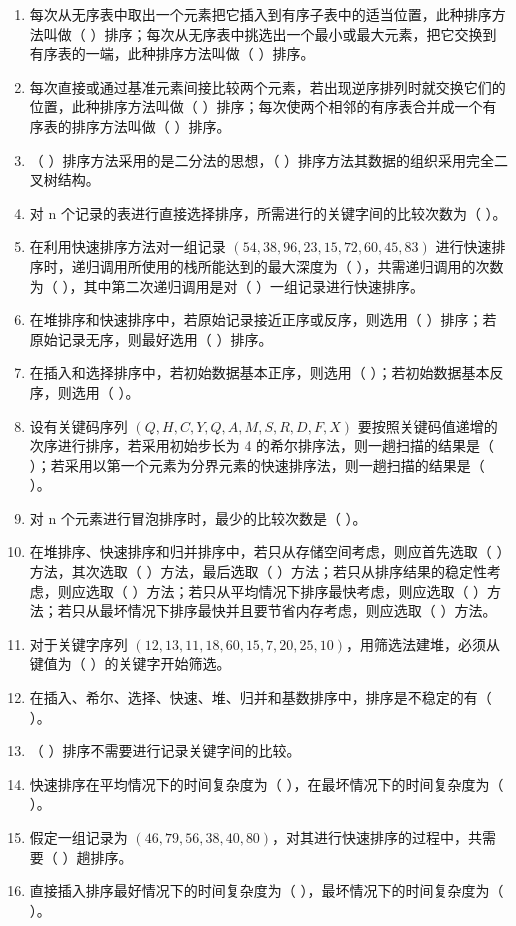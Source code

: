 \documentclass[12pt, a4paper]{article}
\begin{document}
\begin{enumerate}
	\item 每次从无序表中取出一个元素把它插入到有序子表中的适当位置，此种排序方法叫做（ ）排序；每次从无序表中挑选出一个最小或最大元素，把它交换到有序表的一端，此种排序方法叫做（ ）排序。
	\item 每次直接或通过基准元素间接比较两个元素，若出现逆序排列时就交换它们的位置，此种排序方法叫做（ ）排序；每次使两个相邻的有序表合并成一个有序表的排序方法叫做（ ）排序。
	\item （ ）排序方法采用的是二分法的思想，（ ）排序方法其数据的组织采用完全二叉树结构。
	\item 对 n 个记录的表进行直接选择排序，所需进行的关键字间的比较次数为（ ）。
	\item 在利用快速排序方法对一组记录 $(54, 38, 96, 23, 15, 72, 60, 45, 83)$ 进行快速排序时，递归调用所使用的栈所能达到的最大深度为（ ），共需递归调用的次数为（ ），其中第二次递归调用是对（ ）一组记录进行快速排序。
	\item 在堆排序和快速排序中，若原始记录接近正序或反序，则选用（ ）排序；若原始记录无序，则最好选用（ ）排序。
	\item 在插入和选择排序中，若初始数据基本正序，则选用（ ）；若初始数据基本反序，则选用（ ）。
	\item 设有关键码序列 $(Q, H, C, Y, Q, A, M, S, R, D, F, X)$ 要按照关键码值递增的次序进行排序，若采用初始步长为 4 的希尔排序法，则一趟扫描的结果是（ ）；若采用以第一个元素为分界元素的快速排序法，则一趟扫描的结果是（ ）。
	\item 对 n 个元素进行冒泡排序时，最少的比较次数是（ ）。
	\item 在堆排序、快速排序和归并排序中，若只从存储空间考虑，则应首先选取（ ）方法，其次选取（ ）方法，最后选取（ ）方法；若只从排序结果的稳定性考虑，则应选取（ ）方法；若只从平均情况下排序最快考虑，则应选取（ ）方法；若只从最坏情况下排序最快并且要节省内存考虑，则应选取（ ）方法。
	\item 对于关键字序列 $(12, 13, 11, 18, 60, 15, 7, 20, 25, 10)$，用筛选法建堆，必须从键值为（ ）的关键字开始筛选。
	\item 在插入、希尔、选择、快速、堆、归并和基数排序中，排序是不稳定的有（ ）。
	\item （ ）排序不需要进行记录关键字间的比较。
	\item 快速排序在平均情况下的时间复杂度为（ ），在最坏情况下的时间复杂度为（ ）。
	\item 假定一组记录为 $(46, 79, 56, 38, 40, 80)$，对其进行快速排序的过程中，共需要（ ）趟排序。
	\item 直接插入排序最好情况下的时间复杂度为（ ），最坏情况下的时间复杂度为（ ）。

\end{enumerate}
\end{document}
